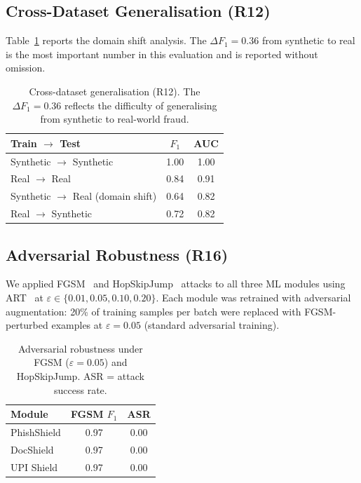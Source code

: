 \documentclass[conference]{IEEEtran}
\begin{document}
\subsection{Cross-Dataset Generalisation (R12)}
Table~\ref{tab:generalization} reports the domain shift analysis.
The $\Delta F_1{=}0.36$ from synthetic to real is the most important
number in this evaluation and is reported without omission.

\begin{table}[t]
\centering
\caption{Cross-dataset generalisation (R12). The $\Delta F_1{=}0.36$
reflects the difficulty of generalising from synthetic to real-world
fraud.}
\label{tab:generalization}
\begin{tabular}{lcc}
\toprule
\textbf{Train} $\to$ \textbf{Test} & \textbf{$F_1$} & \textbf{AUC} \\
\midrule
Synthetic $\to$ Synthetic            & 1.00 & 1.00 \\
Real $\to$ Real                      & 0.84 & 0.91 \\
Synthetic $\to$ Real (domain shift)  & 0.64 & 0.82 \\
Real $\to$ Synthetic                 & 0.72 & 0.82 \\
\bottomrule
\end{tabular}
\end{table}

\subsection{Adversarial Robustness (R16)}
We applied FGSM~\cite{goodfellow2015} and
HopSkipJump~\cite{chen2020} attacks to all three ML modules using
ART~\cite{nicolae2018} at
$\varepsilon\!\in\!\{0.01,0.05,0.10,0.20\}$. Each module was
retrained with adversarial augmentation: 20\% of training samples per
batch were replaced with FGSM-perturbed examples at
$\varepsilon{=}0.05$ (standard adversarial training).

\begin{table}[t]
\centering
\caption{Adversarial robustness under FGSM ($\varepsilon{=}0.05$)
and HopSkipJump. ASR = attack success rate.}
\label{tab:adversarial}
\begin{tabular}{lcc}
\toprule
\textbf{Module} & \textbf{FGSM $F_1$} & \textbf{ASR} \\
\midrule
PhishShield & 0.97 & 0.00 \\
DocShield   & 0.97 & 0.00 \\
UPI Shield  & 0.97 & 0.00 \\
\bottomrule
\end{tabular}
\end{table}
\end{document}
